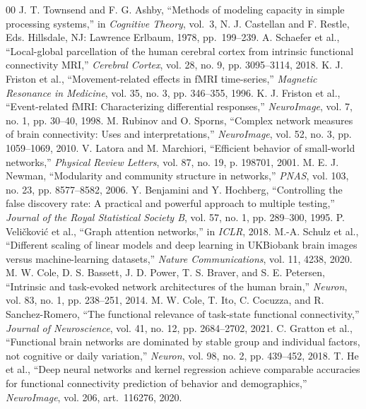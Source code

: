 \documentclass[conference]{IEEEtran}
\begin{document}
\begin{thebibliography}{00}
 J. T. Townsend and F. G. Ashby, ``Methods of modeling capacity in simple processing systems,'' in \textit{Cognitive Theory}, vol.\ 3, N. J. Castellan and F. Restle, Eds. Hillsdale, NJ: Lawrence Erlbaum, 1978, pp.\ 199--239.
 A. Schaefer et al., ``Local-global parcellation of the human cerebral cortex from intrinsic functional connectivity MRI,'' \textit{Cerebral Cortex}, vol. 28, no. 9, pp. 3095--3114, 2018.
 K. J. Friston et al., ``Movement-related effects in fMRI time-series,'' \textit{Magnetic Resonance in Medicine}, vol. 35, no. 3, pp. 346--355, 1996.
 K. J. Friston et al., ``Event-related fMRI: Characterizing differential responses,'' \textit{NeuroImage}, vol. 7, no. 1, pp. 30--40, 1998.
 M. Rubinov and O. Sporns, ``Complex network measures of brain connectivity: Uses and interpretations,'' \textit{NeuroImage}, vol. 52, no. 3, pp. 1059--1069, 2010.
 V. Latora and M. Marchiori, ``Efficient behavior of small-world networks,'' \textit{Physical Review Letters}, vol. 87, no. 19, p. 198701, 2001.
 M. E. J. Newman, ``Modularity and community structure in networks,'' \textit{PNAS}, vol. 103, no. 23, pp. 8577--8582, 2006.
 Y. Benjamini and Y. Hochberg, ``Controlling the false discovery rate: A practical and powerful approach to multiple testing,'' \textit{Journal of the Royal Statistical Society B}, vol. 57, no. 1, pp. 289--300, 1995.
 P. Veli\v{c}kovi\'c et al., ``Graph attention networks,'' in \textit{ICLR}, 2018.
 M.-A. Schulz et al., ``Different scaling of linear models and deep learning in UKBiobank brain images versus machine-learning datasets,'' \textit{Nature Communications}, vol. 11, 4238, 2020.
 M. W. Cole, D. S. Bassett, J. D. Power, T. S. Braver, and S. E. Petersen, ``Intrinsic and task-evoked network architectures of the human brain,'' \textit{Neuron}, vol. 83, no. 1, pp. 238--251, 2014.
 M. W. Cole, T. Ito, C. Cocuzza, and R. Sanchez-Romero, ``The functional relevance of task-state functional connectivity,'' \textit{Journal of Neuroscience}, vol. 41, no. 12, pp. 2684--2702, 2021.
 C. Gratton et al., ``Functional brain networks are dominated by stable group and individual factors, not cognitive or daily variation,'' \textit{Neuron}, vol. 98, no. 2, pp. 439--452, 2018.
 T. He et al., ``Deep neural networks and kernel regression achieve comparable accuracies for functional connectivity prediction of behavior and demographics,'' \textit{NeuroImage}, vol. 206, art.\ 116276, 2020.

\end{thebibliography}
\end{document}
